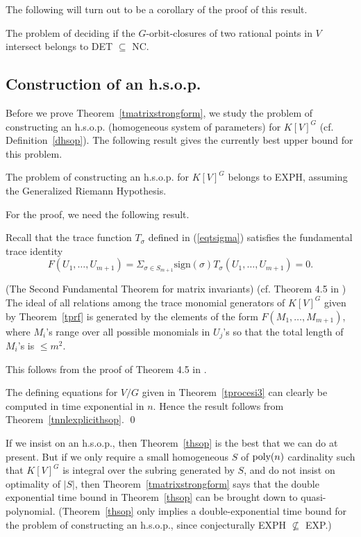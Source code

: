 \documentclass[11pt]{article}
\begin{document}
The following will turn out to be a corollary of the proof of this result.

\begin{theorem} \label{tintroorbitclosureNew}
The problem of deciding if the $G$-orbit-closures of two rational points in $V$ intersect belongs to DET $\subseteq$ NC.
\end{theorem}


\subsection{Construction of an h.s.o.p.}
Before we prove Theorem~\ref{tmatrixstrongform}, 
we   study  the problem of constructing an h.s.o.p. (homogeneous system of parameters) 
for $K[V]^G$ (cf. Definition~\ref{dhsop}). 
The following result gives the currently best upper bound for this problem.

\begin{theorem} \label{thsop}
The problem of constructing an h.s.o.p. for  $K[V]^G$ belongs to EXPH,
assuming the Generalized Riemann Hypothesis.
\end{theorem}

For the proof, we need the following result.

Recall that the trace function $T_\sigma$  defined  in (\ref{eqtsigma}) satisfies 
\cite{procesimatrix}  the fundamental trace identity 
\[ F(U_1,\ldots,U_{m+1})= \Sigma_{\sigma \in S_{m+1}} \mbox{sign}(\sigma) T_\sigma(U_1,\ldots,U_{m+1}) = 0.\] 

\begin{theorem}(The Second Fundamental Theorem for matrix invariants) 
(cf. Theorem 4.5 in \cite{procesimatrix})
\label{tprocesi3}
The ideal of all relations among the trace monomial generators of $K[V]^G$ given by Theorem~\ref{tprf} 
is generated by the elements of the form $F(M_1,\ldots,M_{m+1})$, where $M_i$'s range over all possible monomials in $U_j$'s so that
the total length of $M_i$'s is $\le m^2$.
\end{theorem}

This follows from the proof of Theorem 4.5 in \cite{procesimatrix}. 


The defining equations for $V/G$ given in Theorem~\ref{tprocesi3} can clearly 
be computed in time  exponential in $n$.
Hence the result follows from Theorem~\ref{tnnlexplicithsop}.
\qed 

If we insist on an h.s.o.p., then Theorem~\ref{thsop} is the best that we can do at present.
But if we only require a small homogeneous  $S$  of ${\mbox {poly}}(n)$ 
cardinality such that $K[V]^G$ is integral over the subring generated by $S$, and do not insist 
on optimality of $|S|$, then Theorem~\ref{tmatrixstrongform} 
says  that the double exponential time bound in Theorem~\ref{thsop} 
can be brought down to  quasi-polynomial. (Theorem~\ref{thsop} only 
implies a double-exponential time
bound for the problem of constructing an h.s.o.p.,  since conjecturally 
EXPH $\not \subseteq$ EXP.)
\end{document}
